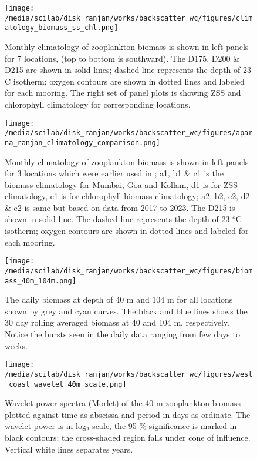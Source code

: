 \documentclass{article}
\begin{document}
\begin{figure}[htbp]
	\centering
	\texttt{[image: /media/scilab/disk\_ranjan/works/backscatter\_wc/figures/climatology\_biomass\_ss\_chl.png]} 
	\captionsetup{justification=justified,font=footnotesize,skip=0.05\baselineskip,width=\textwidth}
	\caption{Monthly climatology of zooplankton biomass is shown in left panels for 7 locations, (top to bottom is southward). The D175, D200 \& D215 are shown in solid lines; dashed line represents the depth of 23 C isotherm; oxygen contours are shown in dotted lines and labeled for each mooring. The right set of panel plots is showing ZSS and chlorophyll climatology for corresponding locations.}
	\label{fig:zsschlclim}
\end{figure}

\begin{figure}[htbp]
	\centering
	\texttt{[image: /media/scilab/disk\_ranjan/works/backscatter\_wc/figures/aparna\_ranjan\_climatology\_comparison.png]} 
	\captionsetup{justification=justified,font=footnotesize,skip=0.05\baselineskip,width=\textwidth}
	\caption{Monthly climatology of zooplankton biomass is shown in left panels for 3 locations which were earlier used in \citep{aparna2022seasonal}; a1, b1 \& c1 is the biomass climatology for Mumbai, Goa and Kollam, d1 is for ZSS climatology, e1 is for chlorophyll biomass climatology; a2, b2, c2, d2 \& e2 is same but based on data from 2017 to 2023. The D215 is shown in solid line. The dashed line represents the depth of 23 $^o$C isotherm; oxygen contours are shown in dotted lines and labeled for each mooring.}
	\label{fig:zsschlclimcomp}
\end{figure}

\begin{figure}[htbp]
	\centering
	\texttt{[image: /media/scilab/disk\_ranjan/works/backscatter\_wc/figures/biomass\_40m\_104m.png]} 
	\captionsetup{justification=justified,font=footnotesize,skip=0.05\baselineskip,width=\textwidth}
	\caption{The daily biomass at depth of 40 m and 104 m for all locations shown by grey and cyan curves. The black and blue lines shows the 30 day rolling averaged biomass at 40 and 104 m, respectively. Notice the bursts seen in the daily data ranging from few days to weeks.}
	\label{fig:compfourty}
\end{figure}

\begin{figure}[htbp]
	\centering
	\texttt{[image: /media/scilab/disk\_ranjan/works/backscatter\_wc/figures/west\_coast\_wavelet\_40m\_scale.png]} 
	\captionsetup{justification=justified,font=footnotesize,skip=0.05\baselineskip,width=\textwidth}
	\caption{Wavelet power spectra (Morlet) of the 40 m zooplankton biomass plotted against time as abscissa and period in days as ordinate. The wavelet power is in log$_2$ scale, the 95 \% significance is marked in black contours; the cross-shaded region falls under cone of influence. Vertical white lines separates years.}
	\label{fig:wavefourty}
\end{figure}
\end{document}
